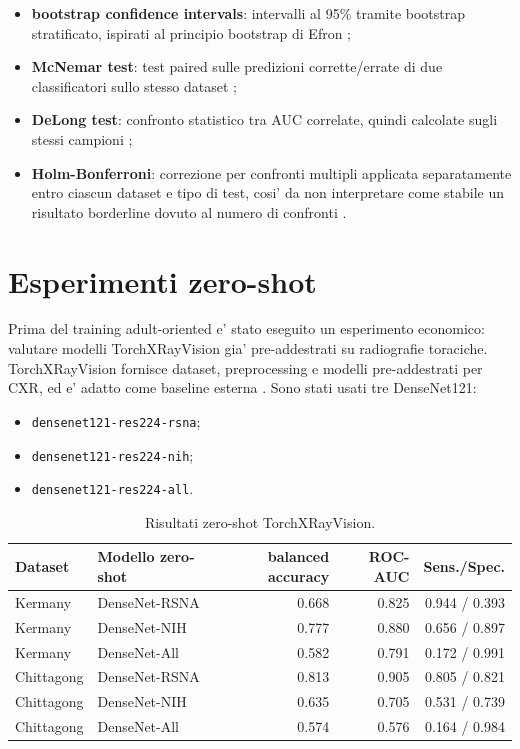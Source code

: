 \documentclass[11pt,a4paper]{article}
\newcommand{\balacc}{balanced accuracy}
\newcommand{\auc}{ROC-AUC}
\begin{document}
\begin{itemize}
  \item \textbf{bootstrap confidence intervals}: intervalli al 95\% tramite
  bootstrap stratificato, ispirati al principio bootstrap di Efron
  \cite{efron1979bootstrap};
  \item \textbf{McNemar test}: test paired sulle predizioni corrette/errate di
  due classificatori sullo stesso dataset \cite{mcnemar1947};
  \item \textbf{DeLong test}: confronto statistico tra AUC correlate, quindi
  calcolate sugli stessi campioni \cite{delong1988};
  \item \textbf{Holm-Bonferroni}: correzione per confronti multipli applicata
  separatamente entro ciascun dataset e tipo di test, cosi' da non interpretare
  come stabile un risultato borderline dovuto al numero di confronti
  \cite{holm1979}.
\end{itemize}

\section{Esperimenti zero-shot}

Prima del training adult-oriented e' stato eseguito un esperimento economico:
valutare modelli TorchXRayVision gia' pre-addestrati su radiografie toraciche.
TorchXRayVision fornisce dataset, preprocessing e modelli pre-addestrati per
CXR, ed e' adatto come baseline esterna \cite{torchxrayvision}. Sono stati
usati tre DenseNet121:

\begin{itemize}
  \item \texttt{densenet121-res224-rsna};
  \item \texttt{densenet121-res224-nih};
  \item \texttt{densenet121-res224-all}.
\end{itemize}

\begin{table}[H]
\centering
\caption{Risultati zero-shot TorchXRayVision.}
\begin{tabular}{llrrr}
\toprule
Dataset & Modello zero-shot & \balacc & \auc & Sens./Spec. \\
\midrule
Kermany & DenseNet-RSNA & 0.668 & 0.825 & 0.944 / 0.393 \\
Kermany & DenseNet-NIH & 0.777 & 0.880 & 0.656 / 0.897 \\
Kermany & DenseNet-All & 0.582 & 0.791 & 0.172 / 0.991 \\
Chittagong & DenseNet-RSNA & 0.813 & 0.905 & 0.805 / 0.821 \\
Chittagong & DenseNet-NIH & 0.635 & 0.705 & 0.531 / 0.739 \\
Chittagong & DenseNet-All & 0.574 & 0.576 & 0.164 / 0.984 \\
\bottomrule
\end{tabular}
\end{table}
\end{document}
